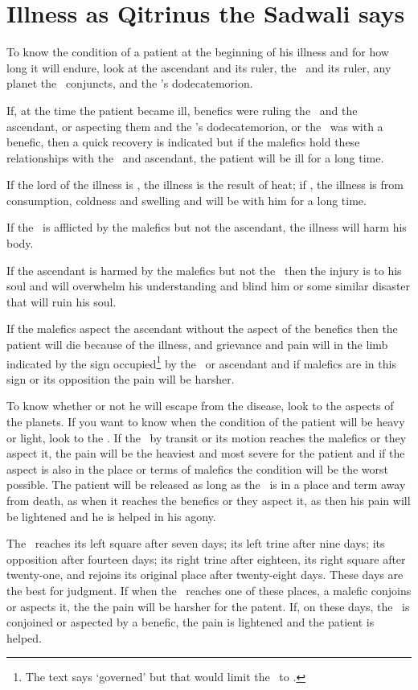 \section{Illness as Qitrinus the Sadwali says}
To know the condition of a patient at the beginning of his illness and for how long it will endure, look at the ascendant and its ruler, the \Moon\, and its ruler, any planet the \Moon\, conjuncts, and the \Moon's dodecatemorion.

If, at the time the patient became ill, benefics were ruling the \Moon\, and the ascendant, or aspecting them and the \Moon's dodecatemorion, or the \Moon\, was with a benefic, then a quick recovery is indicated but if the malefics hold these relationships with the \Moon\, and ascendant, the patient will be ill for a long time.

If the lord of the illness is \Mars, the illness is the result of heat; if \Saturn, the illness is from consumption, coldness and swelling and will be with him for a long time.

If the \Moon\, is afflicted by the malefics but not the ascendant, the illness will harm his body.

If the ascendant is harmed by the malefics but not the \Moon\, then the injury is to his soul and will overwhelm his understanding and blind him or some similar disaster that will ruin his soul.

If the malefics aspect the ascendant without the aspect of the benefics then the patient will die because of the illness, and grievance and pain will in the limb indicated by the sign occupied\footnote{The text says `governed' but that would limit the \Moon\, to \Cancer.} by the \Moon\, or ascendant and if malefics are in this sign or its opposition the pain will be harsher.

To know whether or not he will escape from the disease, look to the aspects of the planets. If you want to know when the condition of the patient will be heavy or light, look to the \Moon. If the \Moon\, by transit or its motion reaches the malefics or they aspect it, the pain will be the heaviest and most severe for the patient and if the aspect is also in the place or terms of malefics the condition will be the worst possible. The patient will be released as long as the \Moon\, is in a place and term away from death, as when it reaches the benefics or they aspect it, as then his pain will be lightened and he is helped in his agony.

The \Moon\, reaches its left square after seven days; its left trine after nine days; its opposition after fourteen days; its right trine after eighteen, its right square after twenty-one, and rejoins its original place after twenty-eight days. These days are the best for judgment. If when the \Moon\, reaches one of these places, a malefic conjoins or aspects it, the the pain will be harsher for the patent. If, on these days, the \Moon\, is conjoined or aspected by a benefic, the pain is lightened and the patient is helped.

